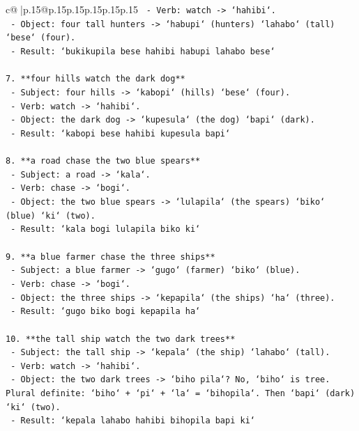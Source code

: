 \documentclass{article}
\begin{document}
{\begin{supertabular}{c@{$\;$}|p{.15\linewidth}@{}p{.15\linewidth}p{.15\linewidth}p{.15\linewidth}p{.15\linewidth}p{.15\linewidth}}
{{{\texttt{   {-} Verb: watch {-}> `hahibi`.} \\
\texttt{   {-} Object: four tall hunters {-}> `habupi` (hunters) `lahabo` (tall) `bese` (four).} \\
\texttt{   {-} Result: `bukikupila bese hahibi habupi lahabo bese`} \\
\\ 
\texttt{7. **four hills watch the dark dog**} \\
\texttt{   {-} Subject: four hills {-}> `kabopi` (hills) `bese` (four).} \\
\texttt{   {-} Verb: watch {-}> `hahibi`.} \\
\texttt{   {-} Object: the dark dog {-}> `kupesula` (the dog) `bapi` (dark).} \\
\texttt{   {-} Result: `kabopi bese hahibi kupesula bapi`} \\
\\ 
\texttt{8. **a road chase the two blue spears**} \\
\texttt{   {-} Subject: a road {-}> `kala`.} \\
\texttt{   {-} Verb: chase {-}> `bogi`.} \\
\texttt{   {-} Object: the two blue spears {-}> `lulapila` (the spears) `biko` (blue) `ki` (two).} \\
\texttt{   {-} Result: `kala bogi lulapila biko ki`} \\
\\ 
\texttt{9. **a blue farmer chase the three ships**} \\
\texttt{   {-} Subject: a blue farmer {-}> `gugo` (farmer) `biko` (blue).} \\
\texttt{   {-} Verb: chase {-}> `bogi`.} \\
\texttt{   {-} Object: the three ships {-}> `kepapila` (the ships) `ha` (three).} \\
\texttt{   {-} Result: `gugo biko bogi kepapila ha`} \\
\\ 
\texttt{10. **the tall ship watch the two dark trees**} \\
\texttt{    {-} Subject: the tall ship {-}> `kepala` (the ship) `lahabo` (tall).} \\
\texttt{    {-} Verb: watch {-}> `hahibi`.} \\
\texttt{    {-} Object: the two dark trees {-}> `biho pila`? No, `biho` is tree. Plural definite: `biho` + `pi` + `la` = `bihopila`. Then `bapi` (dark) `ki` (two).} \\
\texttt{    {-} Result: `kepala lahabo hahibi bihopila bapi ki`} \\
}}}
\end{supertabular}}
\end{document}
